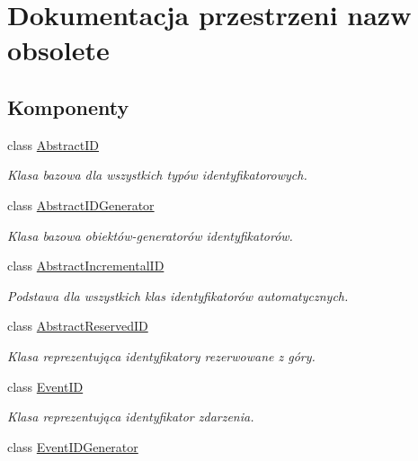 \hypertarget{namespaceobsolete}{
\section{Dokumentacja przestrzeni nazw obsolete}
\label{namespaceobsolete}
}
\subsection*{Komponenty}
\begin{DoxyCompactItemize}
\item 
class \hyperlink{classobsolete_1_1AbstractID}{AbstractID}
\begin{DoxyCompactList}\small\item\em Klasa bazowa dla wszystkich typów identyfikatorowych. \item\end{DoxyCompactList}\item 
class \hyperlink{classobsolete_1_1AbstractIDGenerator}{AbstractIDGenerator}
\begin{DoxyCompactList}\small\item\em Klasa bazowa obiektów-\/generatorów identyfikatorów. \item\end{DoxyCompactList}\item 
class \hyperlink{classobsolete_1_1AbstractIncrementalID}{AbstractIncrementalID}
\begin{DoxyCompactList}\small\item\em Podstawa dla wszystkich klas identyfikatorów automatycznych. \item\end{DoxyCompactList}\item 
class \hyperlink{classobsolete_1_1AbstractReservedID}{AbstractReservedID}
\begin{DoxyCompactList}\small\item\em Klasa reprezentująca identyfikatory rezerwowane z góry. \item\end{DoxyCompactList}\item 
class \hyperlink{classobsolete_1_1EventID}{EventID}
\begin{DoxyCompactList}\small\item\em Klasa reprezentująca identyfikator zdarzenia. \item\end{DoxyCompactList}\item 
class \hyperlink{classobsolete_1_1EventIDGenerator}{EventIDGenerator}

\end{DoxyCompactItemize}
